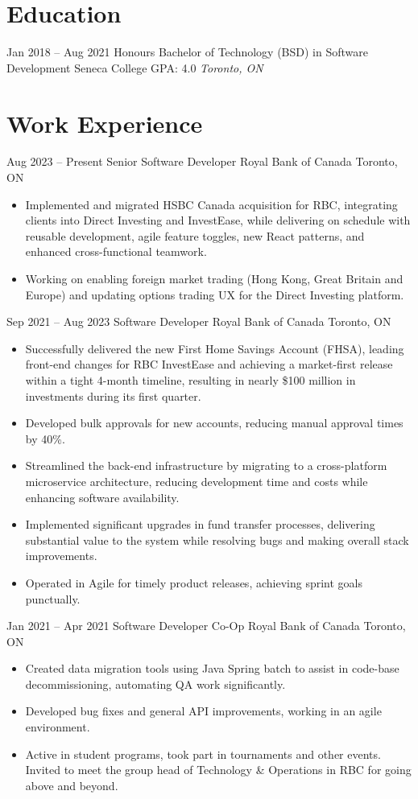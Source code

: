 \documentclass[letterpaper]{moderncv}
\begin{document}
\makecvtitle
    

\section{Education}
\cventry
{Jan 2018 -- Aug 2021}
{Honours Bachelor of Technology (BSD) in Software Development}
{Seneca College}
{GPA: 4.0}
{\textit{Toronto, ON}}
{}
\section{Work Experience}
\cventry
{Aug 2023 -- Present}
{Senior Software Developer}
{Royal Bank of Canada}
{Toronto, ON}
{}
{\begin{itemize}%
	\item Implemented and migrated HSBC Canada acquisition for RBC, integrating clients into Direct Investing and InvestEase, while delivering on schedule with reusable development, agile feature toggles, new React patterns, and enhanced cross-functional teamwork.
	\item Working on enabling foreign market trading (Hong Kong, Great Britain and Europe) and updating options trading UX for the Direct Investing platform.
	\end{itemize}}
\cventry
{Sep 2021 -- Aug 2023}
{Software Developer}
{Royal Bank of Canada}
{Toronto, ON}
{}
{\begin{itemize}%
	\item Successfully delivered the new First Home Savings Account (FHSA), leading front-end changes for RBC InvestEase and achieving a market-first release within a tight 4-month timeline, resulting in nearly \$100 million in investments during its first quarter.
	\item Developed bulk approvals for new accounts, reducing manual approval times by 40\%.
	\item Streamlined the back-end infrastructure by migrating to a cross-platform microservice architecture, reducing development time and costs while enhancing software availability.
	\item Implemented significant upgrades in fund transfer processes, delivering substantial value to the system while resolving bugs and making overall stack improvements.
	\item Operated in Agile for timely product releases, achieving sprint goals punctually.
	\end{itemize}}
\cventry
{Jan 2021 -- Apr 2021}
{Software Developer Co-Op}
{Royal Bank of Canada}
{Toronto, ON}
{}
{\begin{itemize}%
	\item Created data migration tools using Java Spring batch to assist in code-base decommissioning, automating QA work significantly.
	\item Developed bug fixes and general API improvements, working in an agile environment.
	\item Active in student programs, took part in tournaments and other events. Invited to meet the group head of Technology \& Operations in RBC for going above and beyond.
	\end{itemize}}
\end{document}
